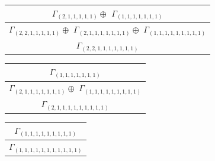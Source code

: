 \documentclass[main.tex]{subfiles}
\begin{document}
\begin{minipage}{.5\textwidth}
\centering
\begin{tabular}{c}
$\Gamma_{(
2 , 
1 , 
1 , 
1 , 
1 , 
1
)} \oplus$
$\Gamma_{(
1 , 
1 , 
1 , 
1 , 
1 , 
1 , 
1
)}$
\\ \hline
$\Gamma_{(
2 , 
2 , 
1 , 
1 , 
1 , 
1 , 
1
)} \oplus$
$\Gamma_{(
2 , 
1 , 
1 , 
1 , 
1 , 
1 , 
1 , 
1
)} \oplus$
$\Gamma_{(
1 , 
1 , 
1 , 
1 , 
1 , 
1 , 
1 , 
1 , 
1
)}$
\\ \hline
$\Gamma_{(
2 , 
2 , 
1 , 
1 , 
1 , 
1 , 
1 , 
1 , 
1
)}$
\\
\end{tabular}\end{minipage}
\bigskip
\begin{minipage}{.5\textwidth}
\centering
\begin{tabular}{c}
$\Gamma_{(
1 , 
1 , 
1 , 
1 , 
1 , 
1 , 
1
)}$
\\ \hline
$\Gamma_{(
2 , 
1 , 
1 , 
1 , 
1 , 
1 , 
1 , 
1
)} \oplus$
$\Gamma_{(
1 , 
1 , 
1 , 
1 , 
1 , 
1 , 
1 , 
1 , 
1
)}$
\\ \hline
$\Gamma_{(
2 , 
1 , 
1 , 
1 , 
1 , 
1 , 
1 , 
1 , 
1 , 
1
)}$
\\
\end{tabular}\end{minipage}
\begin{minipage}{.5\textwidth}
\centering
\begin{tabular}{c}
$\Gamma_{(
1 , 
1 , 
1 , 
1 , 
1 , 
1 , 
1 , 
1 , 
1
)}$
\\ \hline
$\Gamma_{(
1 , 
1 , 
1 , 
1 , 
1 , 
1 , 
1 , 
1 , 
1 , 
1 , 
1
)}$
\\
\end{tabular}\end{minipage}
\end{document}

